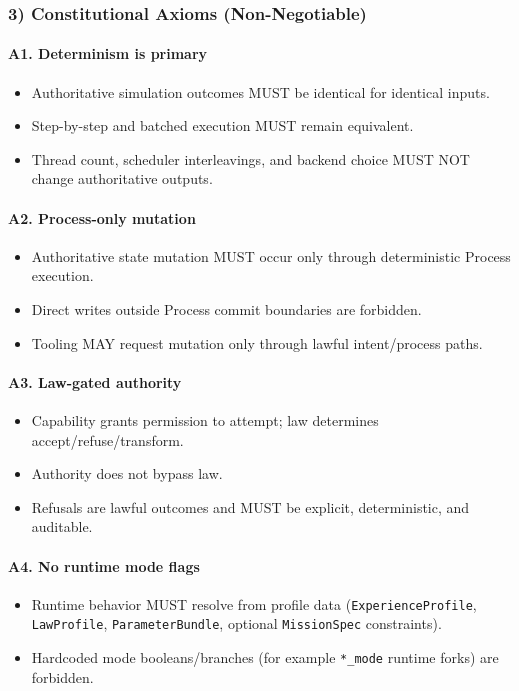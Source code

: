\documentclass[9pt,a4paper,openany]{book}
\begin{document}
\subsubsection{3) Constitutional Axioms (Non-Negotiable)}

\paragraph{A1. Determinism is primary}
\begin{itemize}
\item Authoritative simulation outcomes MUST be identical for identical inputs.\allowbreak{}
\item Step-\allowbreak{}by-\allowbreak{}step and batched execution MUST remain equivalent.\allowbreak{}
\item Thread count, scheduler interleavings, and backend choice MUST NOT change authoritative outputs.\allowbreak{}
\end{itemize}

\paragraph{A2. Process-only mutation}
\begin{itemize}
\item Authoritative state mutation MUST occur only through deterministic Process execution.\allowbreak{}
\item Direct writes outside Process commit boundaries are forbidden.\allowbreak{}
\item Tooling MAY request mutation only through lawful intent/\allowbreak{}process paths.\allowbreak{}
\end{itemize}

\paragraph{A3. Law-gated authority}
\begin{itemize}
\item Capability grants permission to attempt; law determines accept/\allowbreak{}refuse/\allowbreak{}transform.\allowbreak{}
\item Authority does not bypass law.\allowbreak{}
\item Refusals are lawful outcomes and MUST be explicit, deterministic, and auditable.\allowbreak{}
\end{itemize}

\paragraph{A4. No runtime mode flags}
\begin{itemize}
\item Runtime behavior MUST resolve from profile data (\texttt{ExperienceProfile}, \texttt{LawProfile}, \texttt{ParameterBundle}, optional \texttt{MissionSpec} constraints).\allowbreak{}
\item Hardcoded mode booleans/\allowbreak{}branches (for example \texttt{*\_\allowbreak{}mode} runtime forks) are forbidden.\allowbreak{}
\end{itemize}
\end{document}
